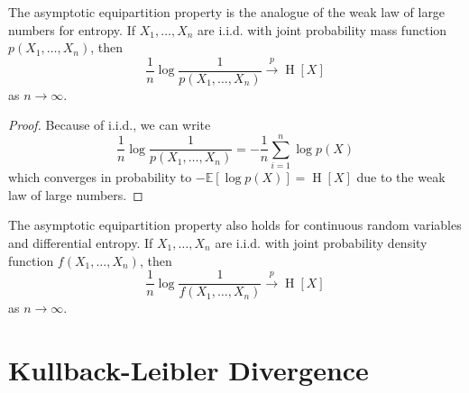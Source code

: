 \documentclass[11pt]{report} %
\begin{document}
The asymptotic equipartition property is the analogue of the weak law of large numbers for entropy. If $X_{1}, \dots, X_{n}$ are i.i.d. with joint probability mass function $p\left(X_{1}, \dots, X_{n}\right)$, then
\begin{equation}
\dfrac{1}{n}\log\dfrac{1}{p\left(X_{1}, \dots, X_{n}\right)} \overset{p}{\to} \operatorname{H}\left[X\right]
\end{equation}
as $n\to\infty$.
\begin{proof}
Because of i.i.d., we can write
\begin{equation}
\dfrac{1}{n}\log\dfrac{1}{p\left(X_{1}, \dots, X_{n}\right)} = -\dfrac{1}{n}\sum_{i = 1}^{n}\log p\left(X\right)
\end{equation}
which converges in probability to $-\mathbb{E}\left[\log p\left(X\right)\right] = \operatorname{H}\left[X\right]$ due to the weak law of large numbers.
\end{proof}
The asymptotic equipartition property also holds for continuous random variables and differential entropy. If $X_{1}, \dots, X_{n}$ are i.i.d. with joint probability density function $f\left(X_{1}, \dots, X_{n}\right)$, then
\begin{equation}
\dfrac{1}{n}\log\dfrac{1}{f\left(X_{1}, \dots, X_{n}\right)} \overset{p}{\to} \operatorname{H}\left[X\right]
\end{equation}
as $n\to\infty$.

\section{Kullback-Leibler Divergence}
\end{document}
